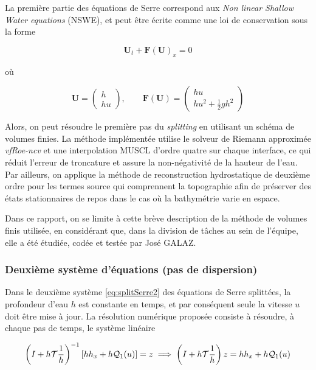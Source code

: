 \indent La première partie des équations de Serre correspond aux \emph{Non linear Shallow Water equations} (NSWE), et peut être écrite comme une loi de conservation sous la forme

\begin{equation*}
	\boldsymbol{U}_t + \boldsymbol{F}(\boldsymbol{U})_x = 0
\end{equation*}

\noindent où

\begin{equation*}
	\boldsymbol{U} = \left(  \begin{array}{c} h \\ hu \end{array} \right), \qquad \boldsymbol{F}(\boldsymbol{U}) = \left(  \begin{array}{c} hu \\ hu^2 + \frac{1}{2}gh^2 \end{array} \right)
\end{equation*}

\indent Alors, on peut résoudre le première pas du \emph{splitting} en utilisant un schéma de volumes finies. La méthode implémentée utilise le solveur de Riemann approximée \emph{vfRoe-ncv} et une interpolation MUSCL d'ordre quatre sur chaque interface, ce qui réduit l'erreur de troncature et assure la non-négativité de la hauteur de l'eau. Par ailleurs, on applique la méthode de reconstruction hydrostatique de deuxième ordre pour les termes source qui comprennent la topographie afin de préserver des états stationnaires de repos dans le cas où la bathymétrie varie en espace.

\indent Dans ce rapport, on se limite à cette brève description de la méthode de volumes finis utilisée, en considérant que, dans la division de tâches au sein de l'équipe, elle a été étudiée, codée et testée par José GALAZ.


\subsubsection{Deuxième système d'équations (pas de dispersion)}

\indent Dans le deuxième système \eqref{eq:splitSerre2} des équations de Serre splittées, la profondeur d'eau $h$ est constante en temps, et par conséquent seule la vitesse $u$ doit être mise à jour.  La résolution numérique proposée consiste à résoudre, à chaque pas de temps, le système linéaire

\begin{equation}
	\label{eq:systemhu}
	\left(I + h\mathcal{T}\frac{1}{h} \right)^{-1}\left[ hh_x + h\mathcal{Q}_1(u) \right]  = z \implies \left(I + h\mathcal{T}\frac{1}{h} \right)z = hh_x + h\mathcal{Q}_1(u)
\end{equation}

